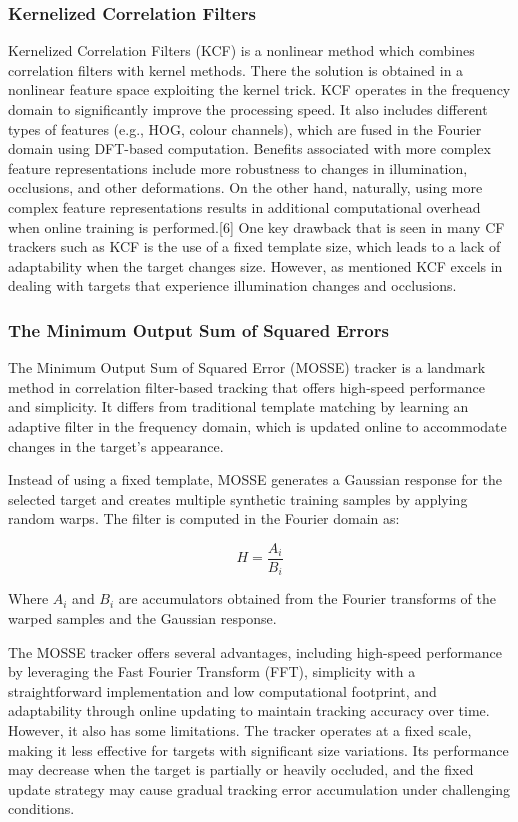 \documentclass{article}
\begin{document}
\subsubsection{Kernelized Correlation Filters}

Kernelized Correlation Filters (KCF) is a nonlinear method which combines correlation filters with kernel methods. There the solution is obtained in a nonlinear feature space exploiting the kernel trick. KCF operates in the frequency domain to significantly improve the processing speed. It also includes different types of features (e.g., HOG, colour channels), which are fused in the Fourier domain using DFT-based computation. Benefits associated with more complex feature representations include more robustness to changes in illumination, occlusions, and other deformations. On the other hand, naturally, using more complex feature representations results in additional computational overhead when online training is performed.[6] One key drawback that is seen in many CF trackers such as KCF is the use of a fixed template size, which leads to a lack of adaptability when the target changes size. However, as mentioned KCF excels in dealing with targets that experience illumination changes and occlusions.

\subsubsection{The Minimum Output Sum of Squared Errors}

The Minimum Output Sum of Squared Error (MOSSE) tracker is a landmark method in correlation filter-based tracking that offers high-speed performance and simplicity. It differs from traditional template matching by learning an adaptive filter in the frequency domain, which is updated online to accommodate changes in the target's appearance.

Instead of using a fixed template, MOSSE generates a Gaussian response for the selected target and creates multiple synthetic training samples by applying random warps. The filter is computed in the Fourier domain as:

\begin{equation}
  H = \frac{A_i}{B_i}
\end{equation}

Where $A_i$ and $B_i$ are accumulators obtained from the Fourier transforms of the warped samples and the Gaussian response.

The MOSSE tracker offers several advantages, including high-speed performance by leveraging the Fast Fourier Transform (FFT), simplicity with a straightforward implementation and low computational footprint, and adaptability through online updating to maintain tracking accuracy over time. However, it also has some limitations. The tracker operates at a fixed scale, making it less effective for targets with significant size variations. Its performance may decrease when the target is partially or heavily occluded, and the fixed update strategy may cause gradual tracking error accumulation under challenging conditions.
\end{document}
